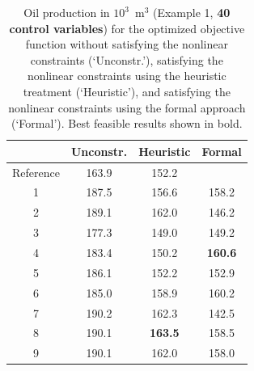 \documentclass[twocolumn,numbook]{svjour3}          %
\begin{document}
\begin{table}
\centering
\caption{Oil production in $10^3$~m$^3$ (Example 1, {\bf 40 control variables}) for the optimized objective function
         without satisfying the nonlinear constraints (`Unconstr.'), satisfying the nonlinear constraints
         using the heuristic treatment (`Heuristic'), and satisfying the nonlinear constraints
         using the formal approach (`Formal'). Best feasible results shown in bold.}
\begin{tabular}{|c|c|c|c|}
\hline
    & Unconstr. & Heuristic & Formal                       \\
\hline
Reference    & 163.9         &  152.2                      &                           \\
1                     & 187.5         &  156.6                      &        158.2        \\
2                     & 189.1         &  162.0                      &        146.2        \\
3                     & 177.3         &  149.0                      &        149.2        \\
4                     & 183.4         &  150.2                      & \bf{ 160.6 }      \\
5                     & 186.1         &  152.2                      &        152.9        \\
6                     & 185.0         &  158.9                      &        160.2        \\
7                     & 190.2         &  162.3                      &        142.5        \\ 
8                     & 190.1         &\bf{163.5}                 &        158.5        \\
9                     & 190.1         &     162.0                   &        158.0        \\
\hline
\end{tabular}
  \label{table:PiC500Steps8}
\end{table}
\end{document}
